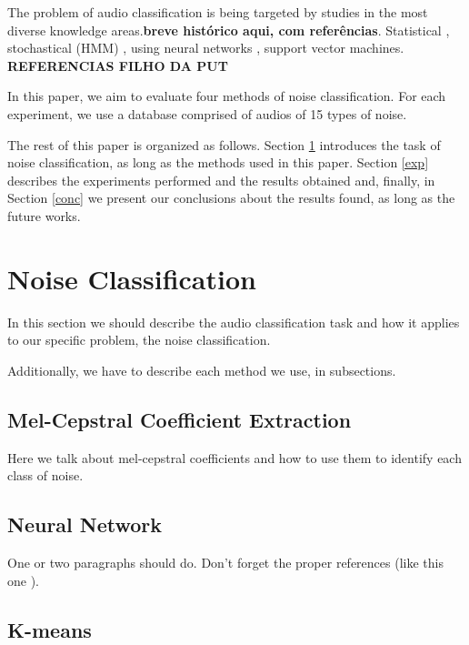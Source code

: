 \documentclass[12pt]{article}
\begin{document}
The problem of audio classification is being targeted by studies in the most diverse knowledge areas.\textbf{breve histórico aqui, com referências}. Statistical \cite{dal1988acoustic,peltonen2002computational}, stochastical (HMM) \cite{ma2003context}, using neural networks \cite{beritelli2005adaptive}, support vector machines. \textbf{REFERENCIAS FILHO DA PUT}


In this paper, we aim to evaluate four methods of noise classification. For each experiment, we use a database comprised of audios of 15 types of noise.

The rest of this paper is organized as follows. Section \ref{class} introduces the task of noise classification, as long as the methods used in this paper. Section \ref{exp} describes the experiments performed and the results obtained and, finally, in Section \ref{conc} we present our conclusions about the results found, as long as the future works.

\section{Noise Classification} \label{class}

In this section we should describe the audio classification task and how it applies to our specific problem, the noise classification.

Additionally, we have to describe each method we use, in subsections.

\subsection{Mel-Cepstral Coefficient Extraction} \label{class:melcepst}

Here we talk about mel-cepstral coefficients and how to use them to identify each class of noise.

\subsection{Neural Network} \label{class:nn}

One or two paragraphs should do. Don't forget the proper references (like this one \cite{lei2014novel}).

\subsection{K-means} \label{class:kmeans}
\end{document}
